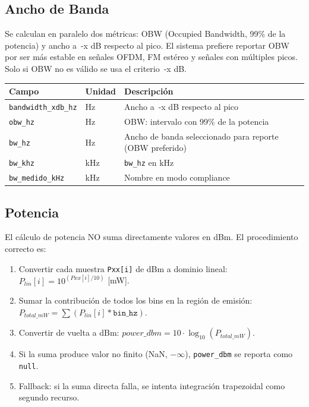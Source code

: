 \subsection{Ancho de Banda}

Se calculan en paralelo dos métricas: OBW (Occupied Bandwidth, 99\% de la potencia) y ancho a \,-x dB respecto al pico. El sistema prefiere reportar OBW por ser más estable en señales OFDM, FM estéreo y señales con múltiples picos. Solo si OBW no es válido se usa el criterio \,-x dB.

\begin{tabular}{p{4cm}p{3cm}p{7cm}}
\textbf{Campo} & \textbf{Unidad} & \textbf{Descripción} \\
\hline
\texttt{bandwidth\_xdb\_hz} & Hz & Ancho a \,-x dB respecto al pico \\
\texttt{obw\_hz} & Hz & OBW: intervalo con 99\% de la potencia \\
\texttt{bw\_hz} & Hz & Ancho de banda seleccionado para reporte (OBW preferido) \\
\texttt{bw\_khz} & kHz & \texttt{bw\_hz} en kHz \\
\texttt{bw\_medido\_kHz} & kHz & Nombre en modo compliance \\
\end{tabular}

\subsection{Potencia}

El cálculo de potencia NO suma directamente valores en dBm. El procedimiento correcto es:

\begin{enumerate}
\item Convertir cada muestra \texttt{Pxx[i]} de dBm a dominio lineal: $P_{lin}[i] = 10^{(Pxx[i]/10)}$ [mW].
\item Sumar la contribución de todos los bins en la región de emisión: $P_{total\_mW} = \sum (P_{lin}[i] * \texttt{bin\_hz})$.
\item Convertir de vuelta a dBm: $power\_dbm = 10 \cdot \log_{10}(P_{total\_mW})$.
\item Si la suma produce valor no finito (NaN, $-\infty$), \texttt{power\_dbm} se reporta como \texttt{null}.
\item Fallback: si la suma directa falla, se intenta integración trapezoidal como segundo recurso.
\end{enumerate}

